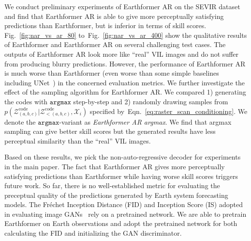 \documentclass{article}
\newcommand{\figref}[1]{Fig.~\ref{#1}}
\newcommand{\eqnref}[1]{Eqn.~\ref{#1}}
\begin{document}
We conduct preliminary experiments of Earthformer AR on the SEVIR dataset and find that Earthformer AR is able to give more perceptually satisfying predictions than Earthformer, but is inferior in terms of skill scores. \figref{fig:nar_vs_ar_80} to~\figref{fig:nar_vs_ar_400} show the qualitative results of Earthformer and Earthformer AR on several challenging test cases. 
The outputs of Earthformer AR look more like ``real'' VIL images and do not suffer from producing blurry predictions. 
However, the performance of Earthformer AR is much worse than Earthformer (even worse than some simple baselines including UNet~\cite{veillette2020sevir}) in the concerned evaluation metrics. 
We further investigate the effect of the sampling algorithm for Earthformer AR. We compared 1) generating the codes with $\mathtt{argmax}$ step-by-step and 2) randomly drawing samples from $p\left(\mathcal{Z}^{\text{code}}_{(a,b,c)}|\mathcal{Z}^{\text{code}}_{<(a,b,c)}, \mathcal{X}_i\right)$ specified by~\eqnref{eq:raster_scan_conditioning}. We denote the $\mathtt{argmax}$-variant as \emph{Earthformer AR argmax}. We find that argmax sampling can give better skill scores but the generated results have less perceptual similarity than the ``real'' VIL images. 

Based on these results, we pick the non-auto-regressive decoder for experiments in the main paper. The fact that Earthformer AR gives more perceptually satisfying predictions than Earthformer while having worse skill scores triggers future work. So far, there is no well-established metric for evaluating the preceptual quality of the predictions generated by Earth system forecasting models. The Fréchet Inception Distance (FID) and  Inception Score (IS) adopted in evaluating image GANs~\cite{lucic2018gans} rely on a pretrained network. We are able to pretrain Earthformer on Earth observations and adopt the pretrained network for both calculating the FID and initializing the GAN discriminator.
\end{document}

